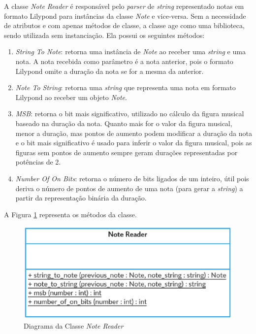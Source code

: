      A classe \textit{Note Reader} é responsável pelo \textit{parser} de \textit{string} representado notas em formato Lilypond para instâncias da classe \textit{Note} e vice-versa. Sem a necessidade de atributos e com apenas métodos de classe, a classe age como uma biblioteca, sendo utilizada sem instanciação. Ela possui os seguintes métodos:


      \begin{enumerate}
        \item \textit{String To Note}: retorna uma instância de \textit{Note} ao receber uma \textit{string} e uma nota. A nota recebida como parâmetro é a nota anterior, pois o formato Lilypond omite a duração da nota se for a mesma da anterior.
        \item \textit{Note To String}: retorna uma \textit{string} que representa uma nota em formato Lilypond ao receber um objeto \textit{Note}.
        \item \textit{MSB}: retorna o bit mais significativo, utilizado no cálculo da figura musical baseado na duração da nota. Quanto mais for o valor da figura musical, menor a duração, mas pontos de aumento podem modificar a duração da nota e o bit mais significativo é usado para inferir o valor da figura musical, pois as figuras sem pontos de aumento sempre geram durações representadas por potências de 2.
        \item \textit{Number Of On Bits}: retorna o número de bits ligados de um inteiro, útil pois deriva o número de pontos de aumento de uma nota (para gerar a \textit{string}) a partir da representação binária da duração.
      \end{enumerate}

      A Figura \ref{notereaderclass} representa os métodos da classe.

      \begin{figure}[htb]
        \centering
        \includegraphics[scale=0.8]{figuras/notereaderclass.eps}
        \caption{Diagrama da Classe \textit{Note Reader}}
        \label{notereaderclass}
      \end{figure}

